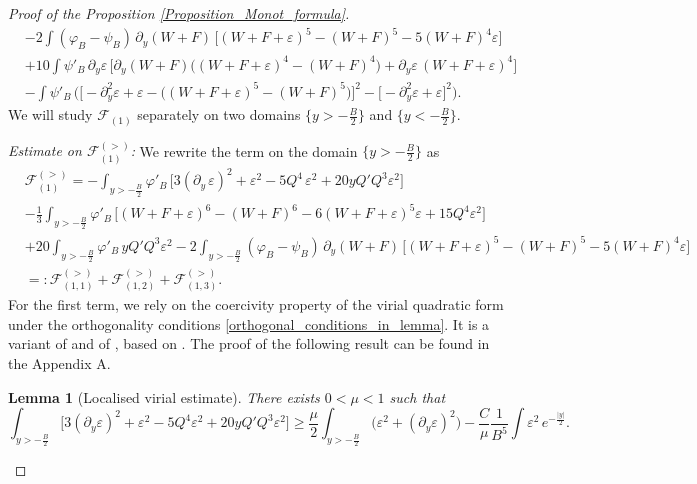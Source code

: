 \documentclass[16pt,english, oneside,reqno]{smfart}
\newcommand{\vare}{{\varepsilon}}
\newcommand{\vphi}{{\varphi}}
\newtheorem{lemma}[theorem]{Lemma}
\begin{document}
\begin{proof}[Proof of the Proposition \ref{Proposition_Monot_formula}]
\begin{equation}
\begin{split}
        & -2 \int (\vphi_B - \psi_B)\, \partial_y(W+F)\, \big[ (W+F+\vare)^5 - (W+F)^5 - 5 (W+F)^4 \vare \big]\\
        & +10 \int \psi'_B \, \partial_y \vare\, \big[ \partial_y (W+F)\big( (W+F+\vare)^4 -(W+F)^4 \big) + \partial_y \vare \, (W+F+\vare)^4 \big]\\
        & - \int \psi'_B\, \Big( \big[ -\partial^2_y \vare + \vare - \big( (W+F+\vare)^5 -(W+F)^5  \big)\big]^2 - \big[ -\partial^2_y\vare + \vare\big]^2 \Big).
    \end{split}
\end{equation}
We will study $\mathcal{F}_{(1)}$ separately on two domains $\{ y > -\frac{B}{2}\}$ and $\{ y < -\frac{B}{2}\}$.

\textit{Estimate on $\mathcal{F}_{(1)}^{(>)}$:}
We rewrite the term on the domain $\{y>-\frac{B}{2}\}$ as
\begin{equation}
\begin{split}
    &\mathcal{F}_{(1)}^{(>)} = 
     - \int_{y>-\frac B2} \vphi'_B\, \big[ 3(\partial_y\,\vare)^2 + \vare^2 - 5Q^4\,\vare^2 + 20y Q'Q^3\vare^2 \big]\\
    & -\frac{1}{3}\int_{y>-\frac B2} \vphi'_B\, \big[ (W+F+\vare)^6 - (W+F)^6 - 6 (W+F+\vare)^5 \vare + 15 Q^4 \vare^2 \big]  \\
    & +20\int_{y>-\frac B2}  \vphi'_B \, y Q' Q^3 \vare^2- 2\int_{y>-\frac B2} (\vphi_B - \psi_B)\, \partial_y(W+F)\,\big[(W+F+\vare)^5 - (W+F)^5 -5(W+F)^4 \vare \big]\\
    & =:\mathcal{F}_{(1,1)}^{(>)} + \mathcal{F}_{(1,2)}^{(>)}+\mathcal{F}_{(1,3)}^{(>)}.
\end{split}
\end{equation}
For the first term, we rely on the coercivity property of the virial quadratic form under the orthogonality conditions \eqref{orthogonal_conditions_in_lemma}. It is a variant of \cite[Lemma 3.5]{Combet-Martel-17} and of \cite[Lemma 3.4]{MMPI}, based on \cite[Proposition 4]{Martel-Merle-00}. The proof of the following result can be found in the Appendix A.
\begin{lemma}[Localised virial estimate]\label{lemma-localized-virial-estimate}
    There exists $0<\mu<1$ such that 
    \begin{equation}\label{estimate-localized-virial}
        \int_{y>-\frac B2} \big[ 3(\partial_y\vare)^2 + \vare^2 - 5 Q^4 \vare^2 + 20y Q' Q^3 \vare^2\big] \geq \frac{\mu}{2}\int_{y>-\frac B2} \big( \vare^2 + (\partial_y \vare)^2 \big) - \frac{C}{\mu}\frac{1}{B^5}\int \vare^2\,e^{-\frac{|y|}{2}}.
    \end{equation}
\end{lemma}


\end{proof}
\end{document}
